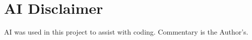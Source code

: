 \documentclass[11pt]{article}
\begin{document}
\section{AI Disclaimer}

AI was used in this project to assist with coding. Commentary is the Author's.
\end{document}
